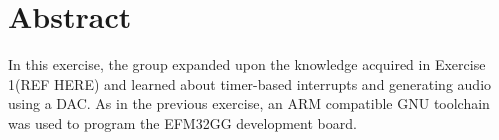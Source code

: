 \chapter*{Abstract}


In this exercise, the group expanded upon the knowledge acquired in Exercise 1(REF HERE) and learned about timer-based interrupts and generating audio using a DAC. As in the previous exercise, an ARM compatible GNU toolchain was used to program the EFM32GG development board. 
